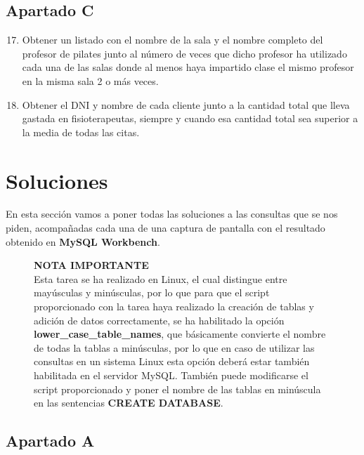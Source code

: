 \subsection{Apartado C}

\begin{enumerate}
    \setcounter{enumi}{16}
    \item Obtener un listado con el nombre de la sala y el nombre completo del profesor de pilates junto al número de veces que dicho profesor ha utilizado cada una de las salas donde al menos haya impartido clase el mismo profesor en la misma sala 2 o más veces.
    \item Obtener el DNI y nombre de cada cliente junto a la cantidad total que lleva gastada en fisioterapeutas, siempre y cuando esa cantidad total sea superior a la media de todas las citas.
\end{enumerate}

\section{Soluciones}
En esta sección vamos a poner todas las soluciones a las consultas que se nos piden, acompañadas cada una de una captura de pantalla con el resultado obtenido en \textbf{MySQL Workbench}.

\begin{figure}[H]
    \begin{tcolorbox}[sharp corners, colback=blue!30, colframe=white!20]
        \normalsize
\textbf{NOTA IMPORTANTE} \\


Esta tarea se ha realizado en Linux, el cual distingue entre mayúsculas y minúsculas, por lo que para que el script proporcionado con la tarea haya realizado la creación de tablas y adición de datos correctamente, se ha habilitado la opción \textbf{lower\_case\_table\_names}, que básicamente convierte el nombre de todas la tablas a minúsculas, por lo que en caso de utilizar las consultas en un sistema Linux esta opción deberá estar también habilitada en el servidor MySQL. También puede modificarse el script proporcionado y poner el nombre de las tablas en minúscula en las sentencias \textbf{CREATE DATABASE}.
    \end{tcolorbox}
\end{figure}

\subsection{Apartado A}

